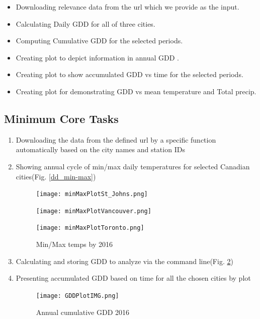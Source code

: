 \documentclass{article}
\begin{document}
\begin{itemize}
\item Downloading relevance data from the url which we provide as the input. 
\item Calculating Daily GDD for all of three cities. 
\item Computing Cumulative GDD for the selected periods.
\item Creating  plot to depict information in annual GDD . 
\item Creating  plot to show accumulated GDD vs time for the selected periods. 
\item Creating plot for demonstrating GDD vs mean temperature and Total precip.
\end{itemize}


\subsection{ \bf Minimum Core Tasks}

\begin{enumerate}
\item  Downloading the data from the defined url by a specific function automatically based on the city names and station IDs
\item  Showing annual cycle of min/max daily temperatures for selected Canadian cities(Fig. \ref{dd_min-max})
\begin{center}
\begin{figure}[H]
\texttt{[image: minMaxPlotSt\_Johns.png]}

\texttt{[image: minMaxPlotVancouver.png]}

\texttt{[image: minMaxPlotToronto.png]}

\caption{Min/Max temps by 2016}
\label{gdd_min-max}
\end{figure}
\end{center}

\item Calculating and storing GDD to analyze via the command line(Fig. \ref{gdd_ann-cycle})
\item  Presenting accumulated GDD based on time for all the chosen cities by plot
\begin{center}
\begin{figure}[H]
\texttt{[image: GDDPlotIMG.png]}
\caption{ Annual cumulative GDD 2016}
\label{gdd_ann-cycle}
\end{figure}
\end{center}

\end{enumerate}
\end{document}
